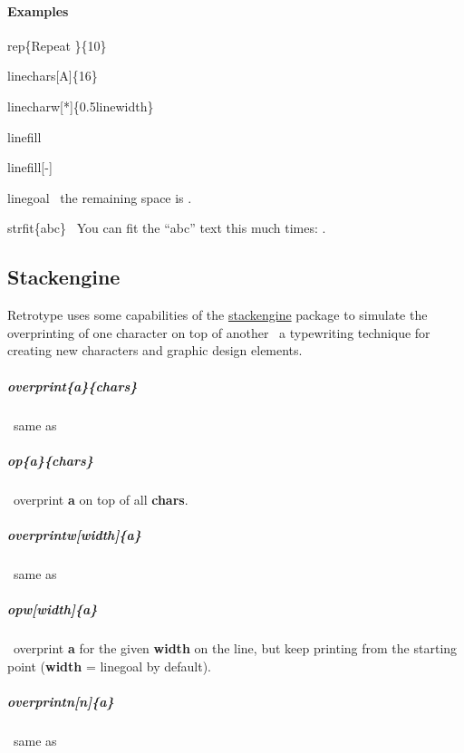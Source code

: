 \documentclass[english,12pt,openany,letterpaper]{book}
\begin{document}
\paragraph{Examples}

\bs rep\{Repeat \}\{10\}


\skipline

\bs linechars[A]\{16\}


\skipline

\bs linecharw[*]\{0.5\bs linewidth\}


\skipline

\bs linefill

\linefill

\skipline

\bs linefill[-]

\linefill[-]

\skipline

\bs linegoal \dash\ the remaining space is \linegoal.

\skipline

\bs strfit\{abc\} \dash\ You can fit the ``abc'' text this much times: .


\break


\subsection{Stackengine}

Retrotype uses some capabilities of the \href{https://www.ctan.org/pkg/stackengine}{stackengine} package to simulate the overprinting of one character on top of another \dash\ a typewriting technique for creating new characters and graphic design elements.

\skipline

\subparagraph{\bs overprint\{a\}\{chars\}} \dash\ same as

\subparagraph{\tabspace\bs op\{a\}\{chars\}} \dash\ overprint \textbf{a} on top of all \textbf{chars}.

\subparagraph{\bs overprintw[width]\{a\}} \dash\ same as

\subparagraph{\tabspace\bs opw[width]\{a\}} \dash\ overprint \textbf{a} for the given \textbf{width} on the line, but keep printing from the starting point (\textbf{width} = \bs linegoal by default).

\subparagraph{\bs overprintn[n]\{a\}} \dash\ same as
\end{document}

